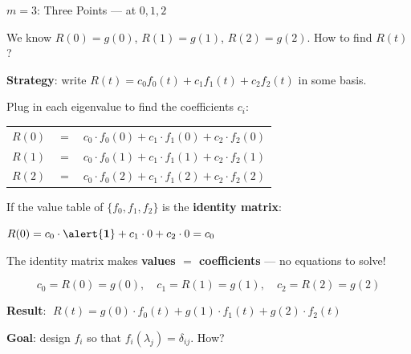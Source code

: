 \documentclass[10pt]{beamer}
\theoremstyle{definition}
\newcommand{\x}[1]{\alert{\textbf{#1}}}
\begin{document}
\begin{frame}[shrink=5]{$m = 3$: Three Points — at $0, 1, 2$}

We know $R(0) = g(0)$, $R(1) = g(1)$, $R(2) = g(2)$. \; How to find $R(t)$?

\vfill

\textbf{Strategy}: write $R(t) = c_0 f_0(t) + c_1 f_1(t) + c_2 f_2(t)$ in some basis.

\vfill\pause

Plug in each eigenvalue to find the coefficients $c_i$:

\medskip

{\small
\begin{center}
\renewcommand{\arraystretch}{1.2}
\begin{tabular}{rcl}
$R(0)$ &$=$& $c_0 \cdot f_0(0) + c_1 \cdot f_1(0) + c_2 \cdot f_2(0)$ \\
$R(1)$ &$=$& $c_0 \cdot f_0(1) + c_1 \cdot f_1(1) + c_2 \cdot f_2(1)$ \\
$R(2)$ &$=$& $c_0 \cdot f_0(2) + c_1 \cdot f_1(2) + c_2 \cdot f_2(2)$
\end{tabular}
\end{center}
}

\vfill

If the value table of $\{f_0, f_1, f_2\}$ is the \x{identity matrix}:

\medskip

\begin{center}
$R(0) = c_0 \cdot \x{1} + c_1 \cdot 0 + c_2 \cdot 0 = c_0$
\end{center}

\vfill

The identity matrix makes \x{values $=$ coefficients} --- no equations to solve!

$$c_0 = R(0) = g(0), \quad c_1 = R(1) = g(1), \quad c_2 = R(2) = g(2)$$

\vfill\pause

\textbf{Result}: $\;R(t) = g(0)\cdot f_0(t) + g(1)\cdot f_1(t) + g(2)\cdot f_2(t)$

\vfill

\x{Goal}: design $f_i$ so that $f_i(\lambda_j) = \delta_{ij}$. How?

\end{frame}
\end{document}
